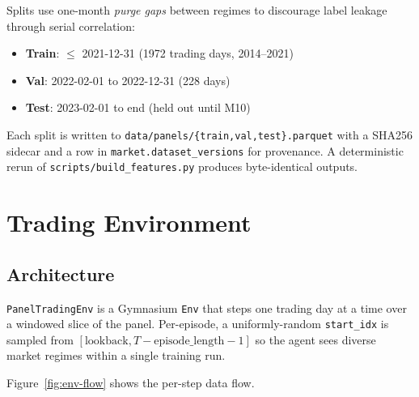 \documentclass[11pt,a4paper]{article}
\begin{document}
Splits use one-month \emph{purge gaps} between regimes to discourage label leakage
through serial correlation:

\begin{itemize}[leftmargin=*]
\item \textbf{Train}: $\le$ 2021-12-31 (1972 trading days, 2014--2021)
\item \textbf{Val}: 2022-02-01 to 2022-12-31 (228 days)
\item \textbf{Test}: 2023-02-01 to end (held out until M10)
\end{itemize}

Each split is written to \texttt{data/panels/\{train,val,test\}.parquet} with a
SHA256 sidecar and a row in \texttt{market.dataset\_versions} for provenance. A
deterministic rerun of \texttt{scripts/build\_features.py} produces byte-identical
outputs.

\section{Trading Environment}

\subsection{Architecture}

\texttt{PanelTradingEnv} is a Gymnasium \texttt{Env} that steps one trading day at a
time over a windowed slice of the panel. Per-episode, a uniformly-random
\texttt{start\_idx} is sampled from $[\text{lookback}, T - \text{episode\_length} - 1]$
so the agent sees diverse market regimes within a single training run.

Figure~\ref{fig:env-flow} shows the per-step data flow.
\end{document}
